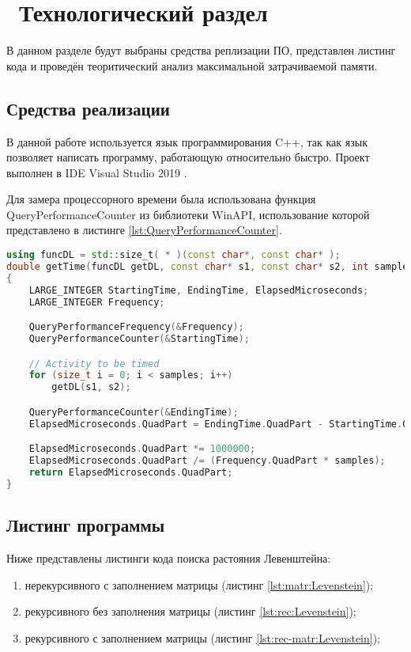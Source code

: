 \chapter{ Технологический раздел}
\label{cha:technological}

    В данном разделе будут выбраны средства реплизации ПО, представлен листинг кода
    и проведён теоритический анализ максимальной затрачиваемой памяти. 

    \section{Средства реализации}
        В данной работе используется язык программирования C++, так как
        язык позволяет написать программу, работающую относительно быстро. 
        Проект выполнен в IDE Visual Studio 2019 \cite{visual-studio}.

        Для замера процессорного времени была использована функция QueryPerformanceCounter \cite{QueryPerformanceCounter} 
        из библиотеки WinAPI, использование которой представлено в листинге \ref{lst:QueryPerformanceCounter}.

        \begin{lstlisting}[language=C++, label=lst:QueryPerformanceCounter, caption=Функция замера времени]
using funcDL = std::size_t( * )(const char*, const char* );
double getTime(funcDL getDL, const char* s1, const char* s2, int samples)
{
    LARGE_INTEGER StartingTime, EndingTime, ElapsedMicroseconds;
    LARGE_INTEGER Frequency;

    QueryPerformanceFrequency(&Frequency);
    QueryPerformanceCounter(&StartingTime);

    // Activity to be timed
    for (size_t i = 0; i < samples; i++)
        getDL(s1, s2);

    QueryPerformanceCounter(&EndingTime);
    ElapsedMicroseconds.QuadPart = EndingTime.QuadPart - StartingTime.QuadPart;

    ElapsedMicroseconds.QuadPart *= 1000000;
    ElapsedMicroseconds.QuadPart /= (Frequency.QuadPart * samples);
    return ElapsedMicroseconds.QuadPart;
}
        \end{lstlisting}

    \section{Листинг программы}
        Ниже представлены листинги кода поиска растояния Левенштейна: \begin{enumerate}
            \item нерекурсивного с заполнением матрицы (листинг \ref{lst:matr:Levenstein});
            \item рекурсивного без заполнения матрицы (листинг \ref{lst:rec:Levenstein});
            \item рекурсивного с заполнением матрицы (листинг \ref{lst:rec-matr:Levenstein});
        \end{enumerate}
        
